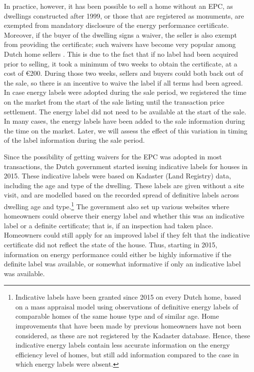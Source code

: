 \documentclass[12pt]{article}
\begin{document}
In practice, however, it has been possible to sell a home without an EPC, as dwellings constructed after 1999, or those that are registered as monuments, are exempted from mandatory disclosure of the energy performance certificate. Moreover, if the buyer of the dwelling signs a waiver, the seller is also exempt from providing the certificate; such waivers have become very popular among Dutch home sellers \citep{brounen2011economics}. This is due to the fact that if no label had been acquired prior to selling, it took a minimum of two weeks to obtain the certificate, at a cost of \euro{200}. During those two weeks, sellers and buyers could both back out of the sale, so there is an incentive to waive the label if all terms had been agreed. In case energy labels were adopted during the sale period, we registered the time on the market from the start of the sale listing until the transaction price settlement. The energy label did not need to be available at the start of the sale. In many cases, the energy labels have been added to the sale information during the time on the market. Later, we will assess the effect of this variation in timing of the label information during the sale period.   

Since the possibility of getting waivers for the EPC was adopted in most transactions, the Dutch government started issuing indicative labels for houses in 2015. These indicative labels were based on Kadaster (Land Registry) data, including the age and type of the dwelling. These labels are given without a site visit, and are modelled based on the recorded spread of definitive labels across dwelling age and type.\footnote{Indicative labels have been granted since 2015 on every Dutch home, based on a mass appraisal model using observations of definitive energy labels of comparable homes of the same house type and of similar age. Home improvements that have been made by previous homeowners have not been considered, as these are not registered by the Kadaster database. Hence, these indicative energy labels contain less accurate information on the energy efficiency level of homes, but still add information compared to the case in which energy labels were absent.} The government also set up various websites where homeowners could observe their energy label and whether this was an indicative label or a definite certificate; that is, if an inspection had taken place. Homeowners could still apply for an improved label if they felt that the indicative certificate did not reflect the state of the house. Thus, starting in 2015, information on energy performance could either be highly informative if the definite label was available, or somewhat informative if only an indicative label was available. 
\end{document}
